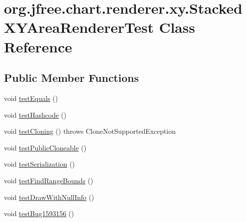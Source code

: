 \hypertarget{classorg_1_1jfree_1_1chart_1_1renderer_1_1xy_1_1_stacked_x_y_area_renderer_test}{}\section{org.\+jfree.\+chart.\+renderer.\+xy.\+Stacked\+X\+Y\+Area\+Renderer\+Test Class Reference}
\label{classorg_1_1jfree_1_1chart_1_1renderer_1_1xy_1_1_stacked_x_y_area_renderer_test}
\subsection*{Public Member Functions}
\begin{DoxyCompactItemize}
\item 
void \mbox{\hyperlink{classorg_1_1jfree_1_1chart_1_1renderer_1_1xy_1_1_stacked_x_y_area_renderer_test_a7fba86a80c095754b158178a602b8fe0}{test\+Equals}} ()
\item 
void \mbox{\hyperlink{classorg_1_1jfree_1_1chart_1_1renderer_1_1xy_1_1_stacked_x_y_area_renderer_test_a41889a3e095623d15861ce003268dd4c}{test\+Hashcode}} ()
\item 
void \mbox{\hyperlink{classorg_1_1jfree_1_1chart_1_1renderer_1_1xy_1_1_stacked_x_y_area_renderer_test_a0378289150a8785872cb6753eaece996}{test\+Cloning}} ()  throws Clone\+Not\+Supported\+Exception 
\item 
void \mbox{\hyperlink{classorg_1_1jfree_1_1chart_1_1renderer_1_1xy_1_1_stacked_x_y_area_renderer_test_a328e582f00bc4f840d6b7aa37df91839}{test\+Public\+Cloneable}} ()
\item 
void \mbox{\hyperlink{classorg_1_1jfree_1_1chart_1_1renderer_1_1xy_1_1_stacked_x_y_area_renderer_test_a558b3ae8702d044f57c34fc22b9a4264}{test\+Serialization}} ()
\item 
void \mbox{\hyperlink{classorg_1_1jfree_1_1chart_1_1renderer_1_1xy_1_1_stacked_x_y_area_renderer_test_ae7cb362e94218fad790c697de9569bd0}{test\+Find\+Range\+Bounds}} ()
\item 
void \mbox{\hyperlink{classorg_1_1jfree_1_1chart_1_1renderer_1_1xy_1_1_stacked_x_y_area_renderer_test_ae01ae000843f3494a02c813751e562b1}{test\+Draw\+With\+Null\+Info}} ()
\item 
void \mbox{\hyperlink{classorg_1_1jfree_1_1chart_1_1renderer_1_1xy_1_1_stacked_x_y_area_renderer_test_aba0e0f9ed850ae4aad51160292b62f36}{test\+Bug1593156}} ()
\end{DoxyCompactItemize}


